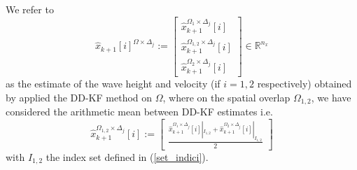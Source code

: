\begin{enumerate}
We refer to 
\begin{equation}
\widehat{x}_{k+1}[i]^{\Omega\times \Delta_{j}}:=\left[\begin{array}{ll}
\widehat{x}_{k+1}^{\Omega_{1}\times \Delta_{j}}[i]\\
\widehat{x}_{k+1}^{\Omega_{1,2}\times \Delta_{j}}[i]\\
\widehat{x}_{k+1}^{\Omega_{2} \times \Delta_{j}}[i]
\end{array}\right]\in \mathbb{R}^{n_{x}}
\end{equation}
as the estimate of the wave height and velocity (if $i=1,2$ respectively) obtained by applied the DD-KF method on $\Omega$, where on the spatial overlap $\Omega_{1,2}$, we have considered the arithmetic mean between DD-KF estimates i.e.
\begin{equation}
 \widehat{x}_{k+1}^{\Omega_{1,2}\times \Delta_{j}}[i]:=\left[\begin{array}{ll}
 \frac{\widehat{x}_{k+1}^{\Omega_{1}\times \Delta_{j}}[i]|_{I_{1,2}
}+ \widehat{x}_{k+1}^{\Omega_{2}\times \Delta_{j}}[i]|_{I_{1,2}
}}{2} \end{array}\right]
\end{equation}
with $I_{1,2}$ the index set defined in (\ref{set_indici}).
\end{enumerate}
\clearpage


